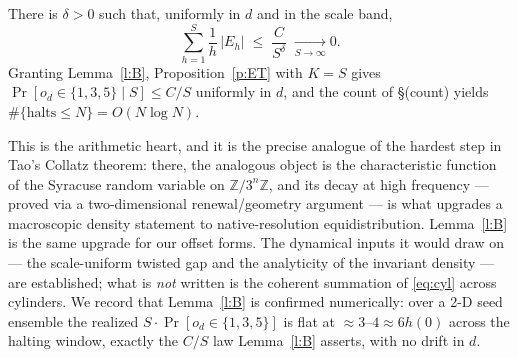 \documentclass[11pt]{article}
\theoremstyle{remark}\newtheorem{remark}{Remark}
\newcommand{\Z}{\mathbb{Z}}\newcommand{\R}{\mathbf{R}}\newcommand{\D}{\mathcal D}
\begin{document}
\begin{lemma}\label{l:B}
There is $\delta>0$ such that, uniformly in $d$ and in the scale band,
\[
\sum_{h=1}^{S}\frac1h\,|E_h|\;\le\;\frac{C}{S^{\delta}}\;\xrightarrow[S\to\infty]{}0 .
\]
Granting Lemma~\ref{l:B}, Proposition~\ref{p:ET} with $K=S$ gives
$\Pr[o_d\in\{1,3,5\}\mid S]\le C/S$ uniformly in $d$, and the count of
\S(count) yields $\#\{\text{halts}\le N\}=O(N\log N)$.
\end{lemma}

\noindent This is the arithmetic heart, and it is the precise analogue of the
hardest step in Tao's Collatz theorem: there, the analogous object is the
characteristic function of the Syracuse random variable on $\Z/3^n\Z$, and its
decay at high frequency --- proved via a two-dimensional renewal/geometry
argument --- is what upgrades a macroscopic density statement to
native-resolution equidistribution. Lemma~\ref{l:B} is the same upgrade for our
offset forms. The dynamical inputs it would draw on --- the scale-uniform
twisted gap and the analyticity of the invariant density --- are established;
what is \emph{not} written is the coherent summation of \eqref{eq:cyl} across
cylinders. We record that Lemma~\ref{l:B} is confirmed numerically: over a
2-D seed ensemble the realized $S\cdot\Pr[o_d\in\{1,3,5\}]$ is flat at
$\approx3$--$4\approx6h(0)$ across the halting window, exactly the $C/S$ law
Lemma~\ref{l:B} asserts, with no drift in $d$.
\end{document}
